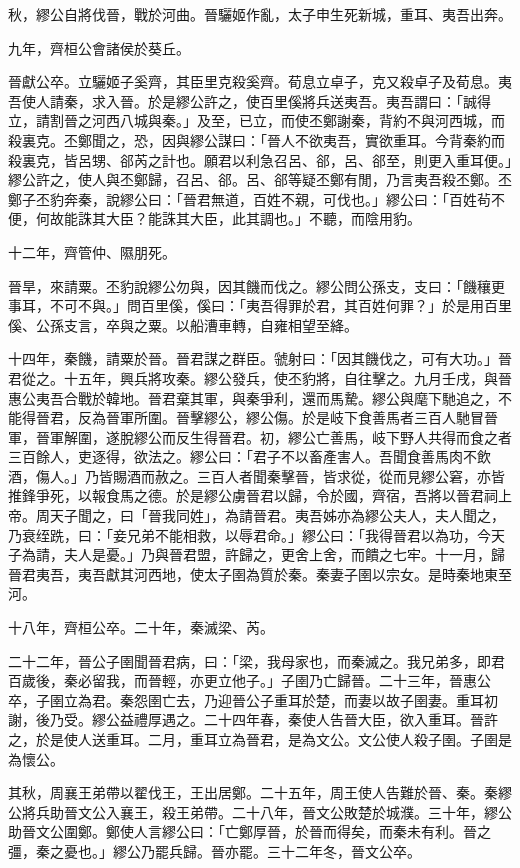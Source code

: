 \begin{pinyinscope}
秋，繆公自將伐晉，戰於河曲。晉驪姬作亂，太子申生死新城，重耳、夷吾出奔。

九年，齊桓公會諸侯於葵丘。

晉獻公卒。立驪姬子奚齊，其臣里克殺奚齊。荀息立卓子，克又殺卓子及荀息。夷吾使人請秦，求入晉。於是繆公許之，使百里傒將兵送夷吾。夷吾謂曰：「誠得立，請割晉之河西八城與秦。」及至，已立，而使丕鄭謝秦，背約不與河西城，而殺裏克。丕鄭聞之，恐，因與繆公謀曰：「晉人不欲夷吾，實欲重耳。今背秦約而殺裏克，皆呂甥、郤芮之計也。願君以利急召呂、郤，呂、郤至，則更入重耳便。」繆公許之，使人與丕鄭歸，召呂、郤。呂、郤等疑丕鄭有閒，乃言夷吾殺丕鄭。丕鄭子丕豹奔秦，說繆公曰：「晉君無道，百姓不親，可伐也。」繆公曰：「百姓茍不便，何故能誅其大臣？能誅其大臣，此其調也。」不聽，而陰用豹。

十二年，齊管仲、隰朋死。

晉旱，來請粟。丕豹說繆公勿與，因其饑而伐之。繆公問公孫支，支曰：「饑穰更事耳，不可不與。」問百里傒，傒曰：「夷吾得罪於君，其百姓何罪？」於是用百里傒、公孫支言，卒與之粟。以船漕車轉，自雍相望至絳。

十四年，秦饑，請粟於晉。晉君謀之群臣。虢射曰：「因其饑伐之，可有大功。」晉君從之。十五年，興兵將攻秦。繆公發兵，使丕豹將，自往擊之。九月壬戌，與晉惠公夷吾合戰於韓地。晉君棄其軍，與秦爭利，還而馬騺。繆公與麾下馳追之，不能得晉君，反為晉軍所圍。晉擊繆公，繆公傷。於是岐下食善馬者三百人馳冒晉軍，晉軍解圍，遂脫繆公而反生得晉君。初，繆公亡善馬，岐下野人共得而食之者三百餘人，吏逐得，欲法之。繆公曰：「君子不以畜產害人。吾聞食善馬肉不飲酒，傷人。」乃皆賜酒而赦之。三百人者聞秦擊晉，皆求從，從而見繆公窘，亦皆推鋒爭死，以報食馬之德。於是繆公虜晉君以歸，令於國，齊宿，吾將以晉君祠上帝。周天子聞之，曰「晉我同姓」，為請晉君。夷吾姊亦為繆公夫人，夫人聞之，乃衰绖跣，曰：「妾兄弟不能相救，以辱君命。」繆公曰：「我得晉君以為功，今天子為請，夫人是憂。」乃與晉君盟，許歸之，更舍上舍，而饋之七牢。十一月，歸晉君夷吾，夷吾獻其河西地，使太子圉為質於秦。秦妻子圉以宗女。是時秦地東至河。

十八年，齊桓公卒。二十年，秦滅梁、芮。

二十二年，晉公子圉聞晉君病，曰：「梁，我母家也，而秦滅之。我兄弟多，即君百歲後，秦必留我，而晉輕，亦更立他子。」子圉乃亡歸晉。二十三年，晉惠公卒，子圉立為君。秦怨圉亡去，乃迎晉公子重耳於楚，而妻以故子圉妻。重耳初謝，後乃受。繆公益禮厚遇之。二十四年春，秦使人告晉大臣，欲入重耳。晉許之，於是使人送重耳。二月，重耳立為晉君，是為文公。文公使人殺子圉。子圉是為懷公。

其秋，周襄王弟帶以翟伐王，王出居鄭。二十五年，周王使人告難於晉、秦。秦繆公將兵助晉文公入襄王，殺王弟帶。二十八年，晉文公敗楚於城濮。三十年，繆公助晉文公圍鄭。鄭使人言繆公曰：「亡鄭厚晉，於晉而得矣，而秦未有利。晉之彊，秦之憂也。」繆公乃罷兵歸。晉亦罷。三十二年冬，晉文公卒。


\end{pinyinscope}

